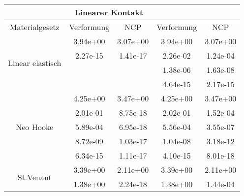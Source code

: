 \begin{table} 
\centering 
\begin{tabular}{c|cc|cc|} 
\cline{2-5} 
 & \multicolumn{2}{|c|}{Linearer Kontakt} &  \\ 
\hline 
\multicolumn{1}{|c|}{Materialgesetz} & \multicolumn{1}{c|}{Verformung} & \multicolumn{1}{c|}{NCP} & \multicolumn{1}{c|}{Verformung} & \multicolumn{1}{c|}{NCP} \\ 
\hline 
\multicolumn{1}{|c|}{\multirow{4}{*}{Linear elastisch}} &\multicolumn{1}{|c|}{  3.94e+00} & \multicolumn{1}{|c|}{  3.07e+00} & \multicolumn{1}{|c|}{  3.94e+00} & \multicolumn{1}{|c|}{  3.07e+00} \\ 
\multicolumn{1}{|c|}{} & \multicolumn{1}{|c|}{  2.27e-15} & \multicolumn{1}{|c|}{  1.41e-17} & \multicolumn{1}{|c|}{  2.26e-02} & \multicolumn{1}{|c|}{  1.24e-04} \\ 
\multicolumn{1}{|c|}{} & \multicolumn{1}{|c|}{} & \multicolumn{1}{|c|}{} & \multicolumn{1}{|c|}{  1.38e-06} & \multicolumn{1}{|c|}{  1.63e-08} \\ 
\multicolumn{1}{|c|}{} & \multicolumn{1}{|c|}{} & \multicolumn{1}{|c|}{} & \multicolumn{1}{|c|}{  4.64e-15} & \multicolumn{1}{|c|}{  2.17e-15} \\ 
\hline 
\multicolumn{1}{|c|}{\multirow{5}{*}{Neo Hooke}} &\multicolumn{1}{|c|}{  4.25e+00} & \multicolumn{1}{|c|}{  3.47e+00} & \multicolumn{1}{|c|}{  4.25e+00} & \multicolumn{1}{|c|}{  3.47e+00} \\ 
\multicolumn{1}{|c|}{} & \multicolumn{1}{|c|}{  2.01e-01} & \multicolumn{1}{|c|}{  8.75e-18} & \multicolumn{1}{|c|}{  2.02e-01} & \multicolumn{1}{|c|}{  1.52e-04} \\ 
\multicolumn{1}{|c|}{} & \multicolumn{1}{|c|}{  5.89e-04} & \multicolumn{1}{|c|}{  6.95e-18} & \multicolumn{1}{|c|}{  5.56e-04} & \multicolumn{1}{|c|}{  3.55e-07} \\ 
\multicolumn{1}{|c|}{} & \multicolumn{1}{|c|}{  8.72e-09} & \multicolumn{1}{|c|}{  1.03e-17} & \multicolumn{1}{|c|}{  1.04e-08} & \multicolumn{1}{|c|}{  3.18e-12} \\ 
\multicolumn{1}{|c|}{} & \multicolumn{1}{|c|}{  6.34e-15} & \multicolumn{1}{|c|}{  1.11e-17} & \multicolumn{1}{|c|}{  4.10e-15} & \multicolumn{1}{|c|}{  8.01e-18} \\ 
\hline 
\multicolumn{1}{|c|}{\multirow{6}{*}{St.Venant}} &\multicolumn{1}{|c|}{  3.39e+00} & \multicolumn{1}{|c|}{  2.11e+00} & \multicolumn{1}{|c|}{  3.39e+00} & \multicolumn{1}{|c|}{  2.11e+00} \\ 
\multicolumn{1}{|c|}{} & \multicolumn{1}{|c|}{  1.38e+00} & \multicolumn{1}{|c|}{  2.24e-18} & \multicolumn{1}{|c|}{  1.38e+00} & \multicolumn{1}{|c|}{  1.44e-04} \\ 

\end{tabular}
\end{table}
